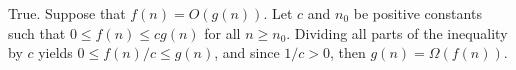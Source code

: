 True.
Suppose that $f(n)=O(g(n))$.
Let $c$ and $n_0$ be positive constants such that $0\le f(n)\le cg(n)$ for all $n\ge n_0$.
Dividing all parts of the inequality by $c$ yields $0\le f(n)/c\le g(n)$, and since $1/c>0$, then $g(n)=\Omega(f(n))$.
